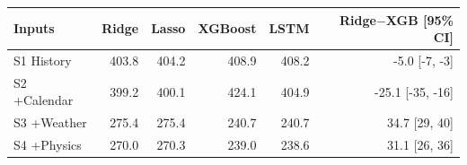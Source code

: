 \begin{tabular}{lrrrrr}
\toprule
Inputs & Ridge & Lasso & XGBoost & LSTM & Ridge$-$XGB [95\% CI] \\
\midrule
S1 History & 403.8 & 404.2 & 408.9 & 408.2 & -5.0 [-7, -3] \\
S2 +Calendar & 399.2 & 400.1 & 424.1 & 404.9 & -25.1 [-35, -16] \\
S3 +Weather & 275.4 & 275.4 & 240.7 & 240.7 & 34.7 [29, 40] \\
S4 +Physics & 270.0 & 270.3 & 239.0 & 238.6 & 31.1 [26, 36] \\
\bottomrule
\end{tabular}